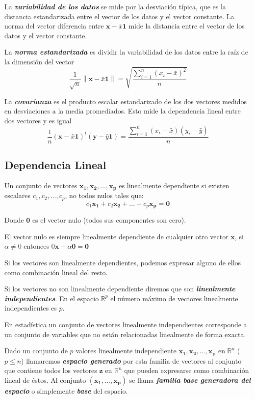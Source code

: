 \documentclass[12pt,letterpaper]{report} %
\begin{document}
La \textit{\textbf{variabilidad de los datos}} se mide por la desviación típica, que es la distancia estandarizada entre el vector de los datos y el vector constante. La norma del vector diferencia entre $\mathbf{x}-\bar x \mathbf{1}$ mide la distancia entre el vector de los datos y el vector constante.

La \textit{\textbf{norma estandarizada}} es dividir la variabilidad de los datos entre la raíz de la dimensión del vector
$$\frac{1}{\sqrt{n}}\left\| \mathbf{x}-\bar x\mathbf{1} \right\|= \sqrt{\frac{\sum_{i=1}^n (x_i-\bar x)^2}{n}}$$ 

La \textit{\textbf{covarianza}} es el producto escalar estandarizado de los dos vectores medidos en desviaciones a la media promediados. Esto mide la dependencia lineal entre dos vectores y es igual
$$\frac{1}{n}(\mathbf{x}-\bar x\mathbf{1})^t(\mathbf{y}-\bar y\mathbf{1})=\frac{\sum_{i=1}^n (x_i-\bar x)(y_i - \bar y)}{n}$$

\subsection{Dependencia Lineal}

Un conjunto de vectores $\mathbf{x_1},\mathbf{x_2},...,\mathbf{x_p}$ es linealmente dependiente si existen escalares $c_1,c_2,...,c_p$, no todos nulos tales que:
$$c_1\mathbf{x_1}+c_2\mathbf{x_2}+...+c_p\mathbf{x_p}=\mathbf{0}$$

Donde $\mathbf{0}$ es el vector nulo (todos sus componentes son cero).

El vector nulo es siempre linealmente dependiente de cualquier otro vector $\mathbf{x}$, si $\alpha\ne 0$ entonces $0\mathbf{x}+\alpha\mathbf{0}=\mathbf{0}$

Si los vectores son linealmente dependientes, podemos expresar alguno de ellos como combinación lineal del resto.

Si los vectores no son linealmente dependiente diremos que son \textit{\textbf{linealmente independientes}}. En el espacio $\mathbb{R}^p$ el número máximo de vectores linealmente
independientes es $p$.

En estadística un conjunto de vectores linealmente independientes corresponde a un conjunto de variables que no están relacionadas linealmente de forma exacta.

Dado un conjunto de $p$ valores linealmente independiente $\mathbf{x_1},\mathbf{x_2},...,\mathbf{x_p}$ en $\mathbb{R}^n$ ($p\le n$) llamaremos \textit{\textbf{espacio generado}} por esta familia de vectores al conjunto que contiene todos los vectores $\mathbf{z}$ en $\mathbb{R}^n$ que pueden expresarse como combinación lineal de éstos. Al conjunto $(\mathbf{x_1},...,\mathbf{x_p})$ se llama \textit{\textbf{familia base generadora del espacio}} o simplemente \textit{\textbf{base}} del espacio.
\end{document}
